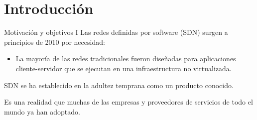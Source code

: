\documentclass[10pt,spanish,xcolor={svgnames}]{beamer}
\begin{document}
\section{Introducción}


\begin{frame}{Motivación y objetivos I}
\vspace{-2em}
Las redes definidas por software (SDN) surgen a principios de 2010 \alert{por necesidad}:
\begin{itemize}
	\item La mayoría de las redes tradicionales fueron diseñadas para aplicaciones cliente-servidor que se ejecutan en una infraestructura no virtualizada.
\end{itemize}

SDN se ha establecido en la adultez temprana como un producto conocido.

Es una realidad que muchas de las empresas y proveedores de servicios de todo el mundo ya han adoptado.


\end{frame}
\end{document}

